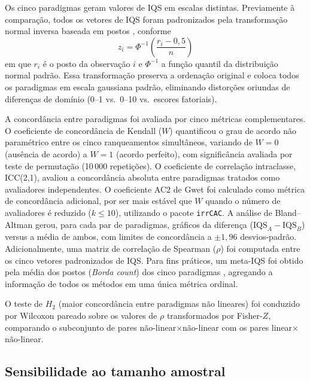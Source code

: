 \documentclass[pdflatex,sn-basic]{sn-jnl}%
\begin{document}
Os cinco paradigmas geram valores de IQS em escalas distintas. Previamente à comparação, todos os vetores de IQS foram padronizados pela transformação normal inversa baseada em postos \cite{Blom1958}, conforme
\begin{equation}
z_i = \Phi^{-1}\!\left(\frac{r_i - 0{,}5}{n}\right)
\label{eq:blom}
\end{equation}
em que $r_i$ é o posto da observação $i$ e $\Phi^{-1}$ a função quantil da distribuição normal padrão. Essa transformação preserva a ordenação original e coloca todos os paradigmas em escala gaussiana padrão, eliminando distorções oriundas de diferenças de domínio (0--1 vs.\ 0--10 vs.\ escores fatoriais).

A concordância entre paradigmas foi avaliada por cinco métricas complementares. O coeficiente de concordância de Kendall ($W$) quantificou o grau de acordo não paramétrico entre os cinco ranqueamentos simultâneos, variando de $W = 0$ (ausência de acordo) a $W = 1$ (acordo perfeito), com significância avaliada por teste de permutação (10\,000 repetições). O coeficiente de correlação intraclasse, ICC(2,1), avaliou a concordância absoluta entre paradigmas tratados como avaliadores independentes. O coeficiente AC2 de Gwet \cite{Gwet2008} foi calculado como métrica de concordância adicional, por ser mais estável que $W$ quando o número de avaliadores é reduzido ($k \leq 10$), utilizando o pacote \texttt{irrCAC}. A análise de Bland--Altman gerou, para cada par de paradigmas, gráficos da diferença ($\text{IQS}_A - \text{IQS}_B$) versus a média de ambos, com limites de concordância a $\pm 1{,}96$ desvios-padrão. Adicionalmente, uma matriz de correlação de Spearman ($\rho$) foi computada entre os cinco vetores padronizados de IQS. Para fins práticos, um meta-IQS foi obtido pela média dos postos (\textit{Borda count}) dos cinco paradigmas \cite{Lin2010}, agregando a informação de todos os métodos em uma única métrica ordinal.

O teste de $H_2$ (maior concordância entre paradigmas não lineares) foi conduzido por Wilcoxon pareado sobre os valores de $\rho$ transformados por Fisher-$Z$, comparando o subconjunto de pares não-linear$\times$não-linear com os pares linear$\times$não-linear.

\subsection{Sensibilidade ao tamanho amostral}\label{subsec:sensitivity}
\end{document}
